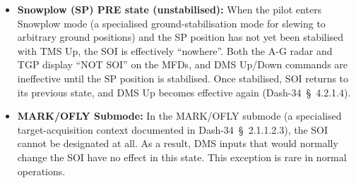 \documentclass[11pt,a4paper]{article}
\providecommand{\dashref}[1]{Dash-34~\S~#1}
\begin{document}
\begin{itemize}
  \item \textbf{Snowplow (SP) PRE state (unstabilised):} When the pilot enters Snowplow mode (a specialised ground-stabilisation mode for slewing to arbitrary ground positions) and the SP position has not yet been stabilised with TMS Up, the SOI is effectively ``nowhere''. Both the A-G radar and TGP display ``NOT SOI'' on the MFDs, and DMS Up/Down commands are ineffective until the SP position is stabilised. Once stabilised, SOI returns to its previous state, and DMS Up becomes effective again (\dashref{4.2.1.4}).
  \item \textbf{MARK/OFLY Submode:} In the MARK/OFLY submode (a specialised target-acquisition context documented in \dashref{2.1.1.2.3}), the SOI cannot be designated at all. As a result, DMS inputs that would normally change the SOI have no effect in this state. This exception is rare in normal operations.
\end{itemize}

\end{document}
